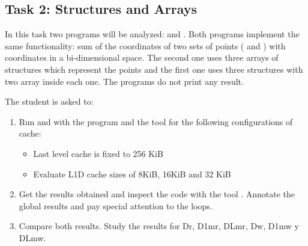 \clearpage
\subsection{Task 2: Structures and Arrays}

In this task two programs will be analyzed:  and
. 
Both programs implement the same functionality: sum of the
coordinates of two sets of points ( and ) with coordinates in
a bi-dimensional space.  The second one uses three arrays of structures which
represent the points and the first one uses three structures with two array
inside each one. 
The programs do not print any result.




The student is asked to: 

\begin{enumerate}

\item Run  and  with the program
 and the tool  for the following configurations of cache:

\begin{itemize}
\item Last level cache is fixed to 256 KiB
\item Evaluate L1D cache sizes of 8KiB, 16KiB and 32 KiB
\end{itemize}

\item Get the results obtained and inspect the code with the tool
. Annotate the global results and pay special
attention to the loops.

\item Compare both results.
Study the results for Dr, D1mr, DLmr, Dw, D1mw y DLmw.

\end{enumerate}
